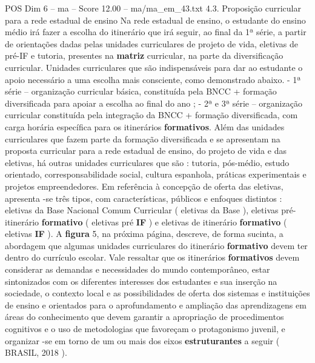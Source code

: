 \begin{textsample}{POS Dim 6 – ma – Score 12.00 – ma/ma\_em\_43.txt}  \label{ex:f6_pos_092}
4.3.
Proposição curricular para a rede estadual de ensino Na rede estadual de ensino, o estudante do ensino médio irá fazer a escolha do itinerário que irá seguir, ao final da 1ª série, a partir de orientações dadas pelas unidades curriculares de projeto de vida, eletivas de pré-IF e tutoria, presentes na \textbf{matriz} curricular, na parte da diversificação curricular.
Unidades curriculares que são indispensáveis para dar ao estudante o apoio necessário a uma escolha mais consciente, como demonstrado abaixo. - 1ª série – organização curricular básica, constituída pela BNCC + formação diversificada para apoiar a escolha ao final do ano ; - 2ª e 3ª série – organização curricular constituída pela integração da BNCC + formação diversificada, com carga horária específica para os itinerários \textbf{formativos}.
Além das unidades curriculares que fazem parte da formação diversificada e se apresentam na proposta curricular para a rede estadual de ensino, do projeto de vida e das eletivas, há outras unidades curriculares que são : tutoria, pós-médio, estudo orientado, corresponsabilidade social, cultura espanhola, práticas experimentais e projetos empreendedores.
Em referência à concepção de oferta das eletivas, apresenta -se três tipos, com características, públicos e enfoques distintos : eletivas da Base Nacional Comum Curricular ( eletivas da Base ), eletivas pré-itinerário \textbf{formativo} ( eletivas pré \textbf{IF} ) e eletivas de itinerário \textbf{formativo} ( eletivas \textbf{IF} ).
A \textbf{figura} 5, na próxima página, descreve, de forma sucinta, a abordagem que algumas unidades curriculares do itinerário \textbf{formativo} devem ter dentro do currículo escolar.
Vale ressaltar que os itinerários \textbf{formativos} devem considerar as demandas e necessidades do mundo contemporâneo, estar sintonizados com os diferentes interesses dos estudantes e sua inserção na sociedade, o contexto local e as possibilidades de oferta dos sistemas e instituições de ensino e orientados para o aprofundamento e ampliação das aprendizagens em áreas do conhecimento que devem garantir a apropriação de procedimentos cognitivos e o uso de metodologias que favoreçam o protagonismo juvenil, e organizar -se em torno de um ou mais dos eixos \textbf{estruturantes} a seguir ( BRASIL, 2018 ).

\end{textsample}
